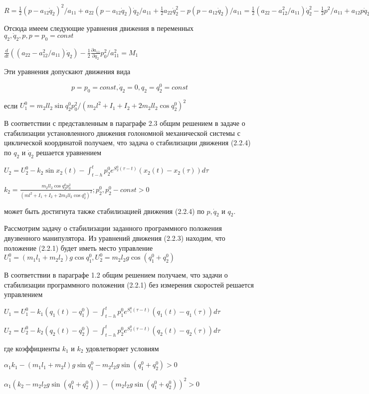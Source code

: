 $R = \frac12 (p - a_{12} \dot q_2)^2 / a_{11} + a_{22} (p - a_{12} \dot q_2) \dot q_2 / a_{11} + \frac12 a_{22} \dot q_2^2 - p (p - a_{12} \dot q_2) / a_{11} = \frac12 (a_22 - a_{12}^2 / a_{11}) \dot q_2^2 - \frac12 p^2 / a_{11} + a_{12} p \dot q_2 / a_{11}$

Отсюда имеем следующие уравнения движения в переменных $q_2, \dot q_2, p, p = p_0 = const$

$\frac{d}{dt} ((a_{22} - a_{12}^2 / a_{11}) \dot q_2) - \frac12 \frac{\partial a_{11}}{\partial q_2} p_0^2 / a_{11}^2 = M_1$


Эти уравнения допускают движения вида 

\begin{equation}
p = p_0 = const, \dot q_2 = 0, q_2 = q_2^0 = const
\end{equation}

если $U_1^0 = m_2 l l_2 \sin q_2^0 p_0^2 / (m_2 l^2 + I_1 + I_2 + 2 m_2 l l_2 \cos q_2^0)^2$

В соответствии с представленным в параграфе 2.3 общим решением в задаче о стабилизации установленного движения голономной механической системы с циклической координатой получаем, что задача о стабилизации движения (2.2.4) по $q_2$ и $\dot q_2$ решается уравнением 

$U_2 = U_2^0 - k_2 \sin x_2 (t) - \int_{t-h}^{t} p_2^0 e^{S_2^0 (\tau - t)} (x_2 (t) - x_2 (\tau)) d \tau$

$k_2 = \frac{m_2 l l_2 \cos q_2^0 p_0^2}{(m l^2 + I_1 + I_2 + 2 m_2 l l_2 \cos q_2^0)^2}; p_2^0,  p_2^0 - const > 0$

может быть достигнута также стабилизацией движения (2.2.4) по $p, \dot q_2$ и $q_2.$

Рассмотрим задачу о стабилизации заданного программного положения двузвенного манипулятора. Из уравнений движения (2.2.3) находим, что положение (2.2.1) будет иметь место управление $U_1^0 = (m_1 l_1 + m_2 l_2) g \cos q_1^0, U_2^0 = m_2 l_2 g \cos (q_1^0 + q_2^0)$

В соответствии в параграфе 1.2 общим решением получаем, что задачи о стабилизации программного положения (2.2.1) без измерения скоростей решается управлением 

$U_1 = U_1^0 - k_1 (q_1(t) - q_1^0) - \int_{t-h}^{t} p_1^0 e^{S_1^0 (\tau - t)} (q_1(t) - q_1(\tau)) d \tau$

$U_2 = U_2^0 - k_2 (q_2(t) - q_2^0) - \int_{t-h}^{t} p_2^0 e^{S_2^0 (\tau - t)} (q_2(t) - q_2(\tau)) d \tau$

где коэффициенты $k_1$ и $k_2$ удовлетворяет условиям 

$\alpha_1 k_1 - (m_1 l_1 + m_2 l) g \sin q_1^0 - m_2 l_2 g \sin (q_1^0 + q_2^0) > 0$

$\alpha_1 (k_2 - m_2 l_2 g \sin (q_1^0 + q_2^0)) - (m_2 l_2 g \sin (q_1^0 + q_2^0))^2 > 0$